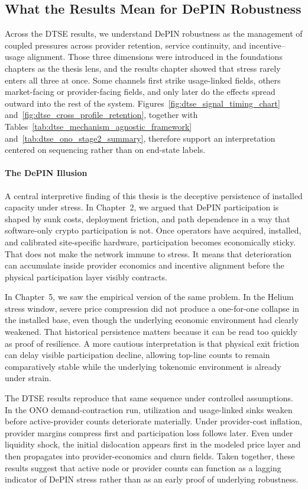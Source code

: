 \subsection{What the Results Mean for DePIN Robustness}
Across the DTSE results, we understand DePIN robustness as the management of coupled pressures across provider retention, service continuity, and incentive--usage alignment. Those three dimensions were introduced in the foundations chapters as the thesis lens, and the results chapter showed that stress rarely enters all three at once. Some channels first strike usage-linked fields, others market-facing or provider-facing fields, and only later do the effects spread outward into the rest of the system. Figures~\ref{fig:dtse_signal_timing_chart} and~\ref{fig:dtse_cross_profile_retention}, together with Tables~\ref{tab:dtse_mechanism_agnostic_framework} and~\ref{tab:dtse_ono_stage2_summary}, therefore support an interpretation centered on sequencing rather than on end-state labels.

\paragraph{The DePIN Illusion}
A central interpretive finding of this thesis is the deceptive persistence of installed capacity under stress. In Chapter~2, we argued that DePIN participation is shaped by sunk costs, deployment friction, and path dependence in a way that software-only crypto participation is not. Once operators have acquired, installed, and calibrated site-specific hardware, participation becomes economically sticky. That does not make the network immune to stress. It means that deterioration can accumulate inside provider economics and incentive alignment before the physical participation layer visibly contracts.

In Chapter~5, we saw the empirical version of the same problem. In the Helium stress window, severe price compression did not produce a one-for-one collapse in the installed base, even though the underlying economic environment had clearly weakened. That historical persistence matters because it can be read too quickly as proof of resilience. A more cautious interpretation is that physical exit friction can delay visible participation decline, allowing top-line counts to remain comparatively stable while the underlying tokenomic environment is already under strain.

The DTSE results reproduce that same sequence under controlled assumptions. In the ONO demand-contraction run, utilization and usage-linked sinks weaken before active-provider counts deteriorate materially. Under provider-cost inflation, provider margins compress first and participation loss follows later. Even under liquidity shock, the initial dislocation appears first in the modeled price layer and then propagates into provider-economics and churn fields. Taken together, these results suggest that active node or provider counts can function as a lagging indicator of DePIN stress rather than as an early proof of underlying robustness.

